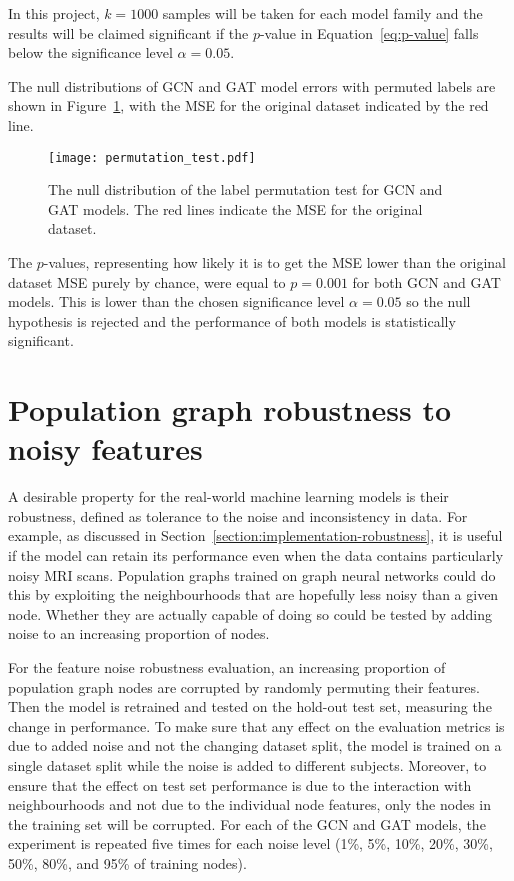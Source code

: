 In this project, $k=1000$ samples will be taken for each model family and the results will be claimed significant if the $p$-value in Equation~\eqref{eq:p-value} falls below the significance level $\alpha=0.05$. 

The null distributions of GCN and GAT model errors with permuted labels are shown in Figure~\ref{figure:permutation-test}, with the MSE for the original dataset indicated by the red line.

\begin{figure}[h]
    \centering
    \texttt{[image: permutation\_test.pdf]}
    \caption{The null distribution of the label permutation test for GCN and GAT models. The red lines indicate the MSE for the original dataset.}\label{figure:permutation-test}
\end{figure}

The $p$-values, representing how likely it is to get the MSE lower than the original dataset MSE purely by chance, were equal to $p=0.001$ for both GCN and GAT models. This is lower than the chosen significance level $\alpha=0.05$ so the null hypothesis is rejected and the performance of both models is statistically significant.


\section{Population graph robustness to noisy features}
A desirable property for the real-world machine learning models is their robustness, defined as tolerance to the noise and inconsistency in data.
For example, as discussed in Section~\ref{section:implementation-robustness}, it is useful if the model can retain its performance even when the data contains particularly noisy MRI scans. Population graphs trained on graph neural networks could do this by exploiting the neighbourhoods that are hopefully less noisy than a given node. Whether they are actually capable of doing so could be tested by adding noise to an increasing proportion of nodes. 

For the feature noise robustness evaluation, an increasing proportion of population graph nodes are corrupted by randomly permuting their features. Then the model is retrained and tested on the hold-out test set, measuring the change in performance. To make sure that any effect on the evaluation metrics is due to added noise and not the changing dataset split, the model is trained on a single dataset split while the noise is added to different subjects. Moreover, to ensure that the effect on test set performance is due to the interaction with neighbourhoods and not due to the individual node features, only the nodes in the training set will be corrupted. For each of the GCN and GAT models, the experiment is repeated five times for each noise level (1\%, 5\%, 10\%, 20\%, 30\%, 50\%, 80\%, and 95\% of training nodes).


